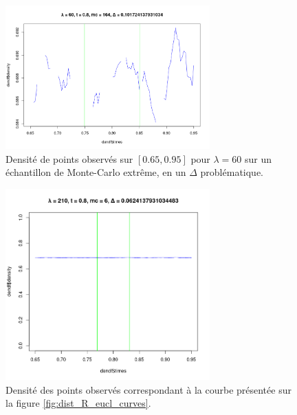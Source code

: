 \begin{figure}[H]
	\centering
	\includegraphics[width=0.7\textwidth]{Images/indiv_vs_glob/Tdensity_lbd60_mc164.png}
	\caption{Densité de points observés sur $[0.65, 0.95]$ pour $\lambda = 60$ sur un échantillon de Monte-Carlo extrême, en un $\Delta$ problématique.}
	\label{fig:den_ex}
\end{figure}


\begin{figure}[H]
	\centering
	\includegraphics[width=0.7\textwidth]{Images/indiv_vs_glob/worst_210_67_mc6.png}
	\caption{Densité des points observés correspondant à la courbe présentée sur la figure \ref{fig:dist_R_eucl_curves}.}
	\label{fig:den_counterex}
\end{figure}

\largeskip


